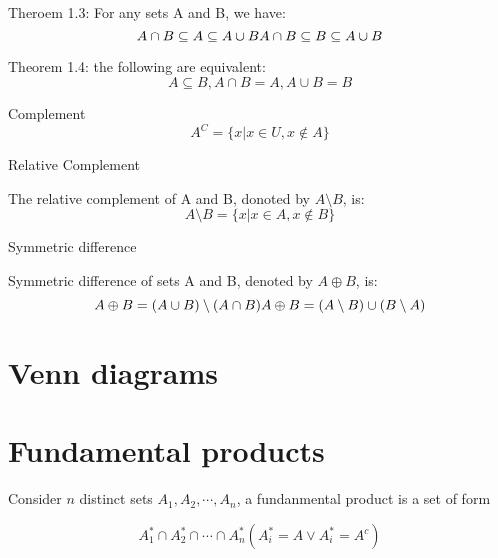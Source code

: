 \documentclass{book}
\begin{document}
Theroem 1.3: For any sets A and B, we have:
$$
A \cap B \subseteq A \subseteq A \cup B \\
A \cap B \subseteq B \subseteq A \cup B
$$

Theorem 1.4: the following are equivalent:
$$
A \subseteq B, A \cap B = A, A \cup B = B
$$

Complement
$$
A^C = \{ x | x \in U, x \not\in A \}
$$

Relative Complement

The relative complement of A and B, donoted by $A\setminus B$, is:
$$
A\setminus B = \{ x | x \in A, x \not\in B \}
$$

Symmetric difference

Symmetric difference of sets A and B, denoted by $A \oplus B$, is:
$$
A \oplus B = (A \cup B)\setminus(A \cap B) \\
A \oplus B = (A \setminus B) \cup (B \setminus A)
$$

\section{Venn diagrams}

\section{Fundamental products}

Consider $n$ distinct sets $A_1, A_2, \cdots, A_n$,
a fundanmental product is a set of form

$$
A_1^* \cap A_2^* \cap \cdots \cap A_n^* (A_i^* = A \lor A_i^* = A^c)
$$
\end{document}
